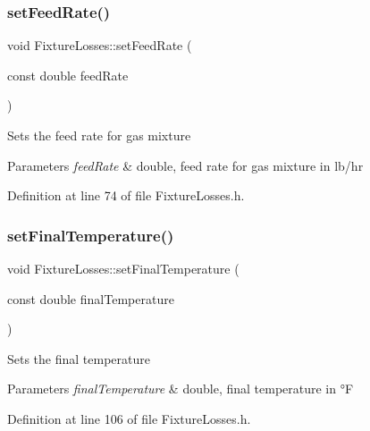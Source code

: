 \subsubsection{\texorpdfstring{set\+Feed\+Rate()}{setFeedRate()}\hspace{0.1cm}{\footnotesize\ttfamily [3/3]}}
{\footnotesize\ttfamily void Fixture\+Losses\+::set\+Feed\+Rate (\begin{DoxyParamCaption}\item[{const double}]{feed\+Rate }\end{DoxyParamCaption})\hspace{0.3cm}{\ttfamily [inline]}}

Sets the feed rate for gas mixture 
\begin{DoxyParams}{Parameters}
{\em feed\+Rate} & double, feed rate for gas mixture in lb/hr \\
\hline
\end{DoxyParams}


Definition at line 74 of file Fixture\+Losses.\+h.

\mbox{\label{class_fixture_losses_a5b65e7118cb96c4f4c88c0d6d1a4f6d3}} 
\subsubsection{\texorpdfstring{set\+Final\+Temperature()}{setFinalTemperature()}\hspace{0.1cm}{\footnotesize\ttfamily [1/3]}}
{\footnotesize\ttfamily void Fixture\+Losses\+::set\+Final\+Temperature (\begin{DoxyParamCaption}\item[{const double}]{final\+Temperature }\end{DoxyParamCaption})\hspace{0.3cm}{\ttfamily [inline]}}

Sets the final temperature 
\begin{DoxyParams}{Parameters}
{\em final\+Temperature} & double, final temperature in °F \\
\hline
\end{DoxyParams}


Definition at line 106 of file Fixture\+Losses.\+h.

\mbox{\label{class_fixture_losses_a5b65e7118cb96c4f4c88c0d6d1a4f6d3}} 
